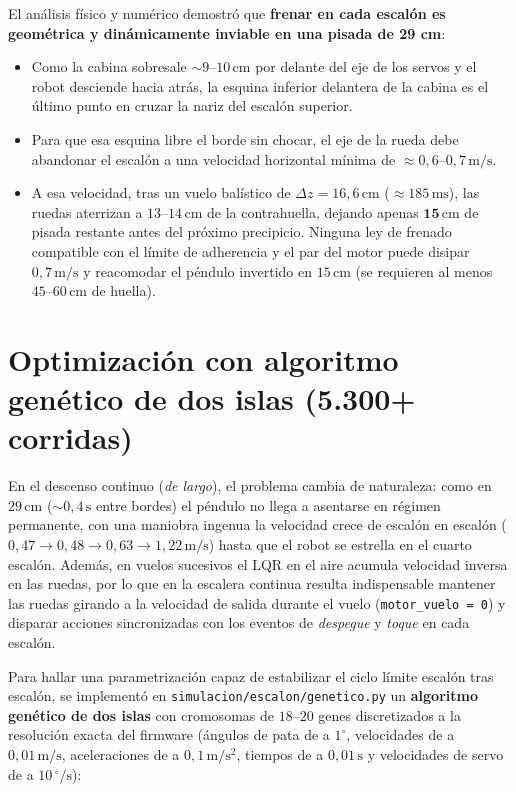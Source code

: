 \documentclass[11pt,a4paper]{report}
\newcommand{\ud}[1]{\,\mathrm{#1}}
\begin{document}
El análisis físico y numérico demostró que \textbf{frenar en cada escalón es geométrica y
dinámicamente inviable en una pisada de 29 cm}:
\begin{itemize}[leftmargin=1.5em]
\item Como la cabina sobresale $\sim 9\text{--}10\ud{cm}$ por delante del eje de los servos y el
      robot desciende hacia atrás, la esquina inferior delantera de la cabina es el último punto
      en cruzar la nariz del escalón superior.
\item Para que esa esquina libre el borde sin chocar, el eje de la rueda debe abandonar el
      escalón a una velocidad horizontal mínima de $\approx 0{,}6\text{--}0{,}7\ud{m/s}$.
\item A esa velocidad, tras un vuelo balístico de $\Delta z = 16{,}6\ud{cm}$ ($\approx 185\ud{ms}$),
      las ruedas aterrizan a $13\text{--}14\ud{cm}$ de la contrahuella, dejando apenas
      $\mathbf{15\ud{cm}}$ de pisada restante antes del próximo precipicio. Ninguna ley de
      frenado compatible con el límite de adherencia y el par del motor puede disipar
      $0{,}7\ud{m/s}$ y reacomodar el péndulo invertido en $15\ud{cm}$ (se requieren al menos
      $45\text{--}60\ud{cm}$ de huella).
\end{itemize}

\section{Optimización con algoritmo genético de dos islas (5.300+ corridas)}

En el descenso continuo (\emph{de largo}), el problema cambia de naturaleza: como en $29\ud{cm}$
($\sim 0{,}4\ud{s}$ entre bordes) el péndulo no llega a asentarse en régimen permanente, con
una maniobra ingenua la velocidad crece de escalón en escalón ($0{,}47 \to 0{,}48 \to 0{,}63
\to 1{,}22\ud{m/s}$) hasta que el robot se estrella en el cuarto escalón. Además, en vuelos
sucesivos el LQR en el aire acumula velocidad inversa en las ruedas, por lo que en la escalera
continua resulta indispensable mantener las ruedas girando a la velocidad de salida durante el
vuelo (\texttt{motor\_vuelo = 0}) y disparar acciones sincronizadas con los eventos de
\emph{despegue} y \emph{toque} en cada escalón.

Para hallar una parametrización capaz de estabilizar el ciclo límite escalón tras escalón, se
implementó en \texttt{simulacion/escalon/genetico.py} un \textbf{algoritmo genético de dos islas}
con cromosomas de $18\text{--}20$ genes discretizados a la resolución exacta del firmware
(ángulos de pata de a $1^\circ$, velocidades de a $0{,}01\ud{m/s}$, aceleraciones de a
$0{,}1\ud{m/s^2}$, tiempos de a $0{,}01\ud{s}$ y velocidades de servo de a $10\ud{^\circ/s}$):
\end{document}
